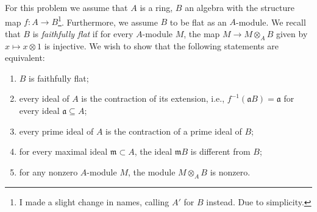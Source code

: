 \documentclass{article}
\newcommand{\m}{\mathfrak{m}}
\newcommand{\tensor}{\otimes}
\renewcommand{\a}{\mathfrak{a}}
\begin{document}
    For this problem we assume that $A$ is a ring, $B$ an algebra with the
    structure map $f \colon A \to B$\footnote{I made a slight change in
    names, calling $A'$ for $B$ instead. Due to simplicity.}. Furthermore,
    we assume $B$ to be flat as an $A$-module. We recall that $B$ is
    \emph{faithfully flat} if for every $A$-module $M$, the map $M \to M
    \tensor_A B$ given by $x \mapsto x \tensor 1$ is injective. We wish to
    show that the following statements are equivalent:

    \begin{enumerate}[(1)]
        \item $B$ is faithfully flat;
        \item every ideal of $A$ is the contraction of its extension, i.e.,
            $f^{-1}(\a B) = \a$ for every ideal $\a \subseteq A$;
        \item every prime ideal of $A$ is the contraction of a prime ideal of
            $B$;
        \item for every maximal ideal $\m \subset A$, the ideal $\m B$ is
            different from $B$;
        \item for any nonzero $A$-module $M$, the module $M \tensor_A B$ is
            nonzero.
    \end{enumerate}
\end{document}
